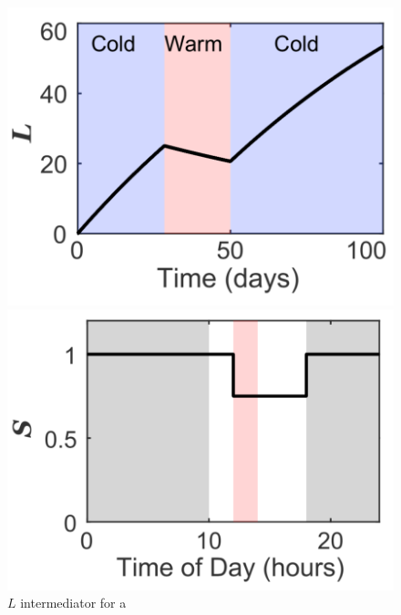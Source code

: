 \documentclass[11pt, a4paper]{article}
\begin{document}
\begin{figure}[H]
    \centering
    \begin{minipage}{0.4\textwidth}
        \centering
        \includegraphics[width=1.0\textwidth]{./images/param_L.png}
        \caption{$L$ intermediator for a }
    \end{minipage}
    \hfill
    \begin{minipage}{0.4\textwidth}
        \centering
        \includegraphics[width=1.0\textwidth]{./images/param_S.png}
    \end{minipage}
\end{figure}
\end{document}
